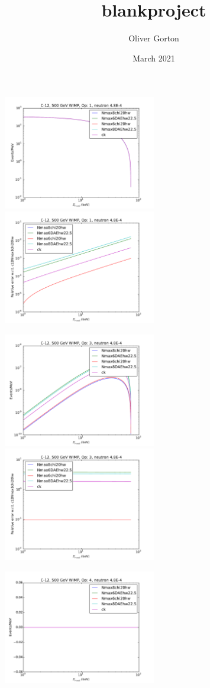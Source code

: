 \documentclass{article}
\title{blankproject}
\author{Oliver Gorton}
\date{March 2021}
\begin{document}
\includegraphics[width=0.5\textwidth]{c12-o1}
\includegraphics[width=0.5\textwidth]{c12-o1-relerr}

\includegraphics[width=0.5\textwidth]{c12-o3}
\includegraphics[width=0.5\textwidth]{c12-o3-relerr}

\includegraphics[width=0.5\textwidth]{c12-o4}
\end{document}
